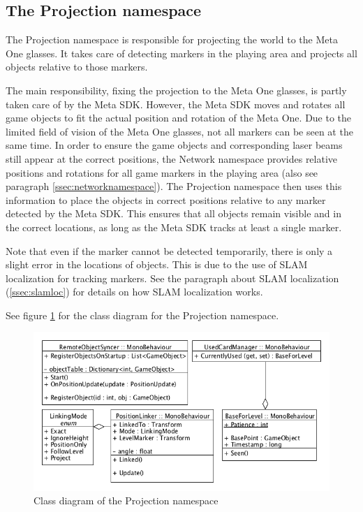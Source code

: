 		\subsection{The Projection namespace} \label{ssec:projectionnamespace}
			The Projection namespace is responsible for projecting the 
			world to the Meta One glasses. It takes care of detecting 
			markers in the playing area and projects all objects relative
			to those markers. 
			
			The main responsibility, fixing the projection to the Meta One 
			glasses, is partly taken care of by the Meta SDK. However, the 
			Meta SDK moves and rotates all game objects to fit the actual 
			position and rotation of the Meta One. Due to the limited field 
			of vision of the Meta One glasses, not all markers can be seen at 
			the same time. In order to ensure the game objects and 
			corresponding laser beams still appear at the correct positions,
			the Network namespace provides relative positions and rotations for 
			all game markers in the playing area (also see paragraph 
			\ref{ssec:networknamespace}). The Projection namespace then uses
			this information to place the objects in correct positions relative
			to any marker detected by the Meta SDK. This ensures that all objects
			remain visible and in the correct locations, as long as the Meta SDK 
			tracks at least a single marker.
			
			Note that even if the marker cannot be detected temporarily, there 
			is only a slight error in the locations of objects. This is due to 
			the use of SLAM localization for tracking markers. See the paragraph
			about SLAM localization (\ref{ssec:slamloc}) for details on how SLAM 
			localization works.
			
			See figure \ref{fig:classdiagramprojection} for the class diagram for 
			the Projection namespace.
			
			\begin{figure}[ht]
				\includegraphics[width=\textwidth]{ClassDiagramProjection}
				\caption{Class diagram of the Projection namespace}
				\label{fig:classdiagramprojection}
			\end{figure}

